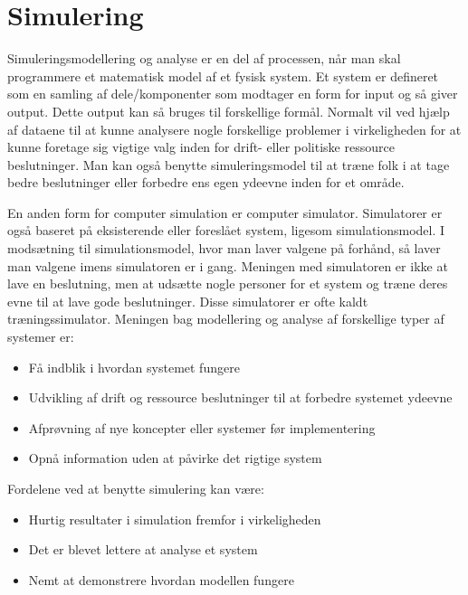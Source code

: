 \chapter{Simulering}\label{Simulering}

Simuleringsmodellering og analyse er en del af processen, når man skal programmere et matematisk model af et fysisk system. Et system er defineret som en samling af dele/komponenter som modtager en form for input og så giver output. Dette output kan så bruges til forskellige formål. Normalt vil ved hjælp af dataene til at kunne analysere nogle forskellige problemer i virkeligheden for at kunne foretage sig vigtige valg inden for drift- eller politiske ressource beslutninger. Man kan også benytte simuleringsmodel til at træne folk i at tage bedre beslutninger eller forbedre ens egen ydeevne inden for et område. \cite[s. 16-20]{SimulationHandbook}

\vspace{5mm}

En anden form for computer simulation er computer simulator. Simulatorer er også baseret på eksisterende eller foreslået system, ligesom simulationsmodel. I modsætning til simulationsmodel, hvor man laver valgene på forhånd, så laver man valgene imens simulatoren er i gang. Meningen med simulatoren er ikke at lave en beslutning, men at udsætte nogle personer for et system og træne deres evne til at lave gode beslutninger. Disse simulatorer er ofte kaldt træningssimulator. Meningen bag modellering og analyse af forskellige typer af systemer er:

\begin{itemize}
\item Få indblik i hvordan systemet fungere
\item Udvikling af drift og ressource beslutninger til at forbedre systemet ydeevne
\item Afprøvning af nye koncepter eller systemer før implementering
\item Opnå information uden at påvirke det rigtige system
\end{itemize}

\vspace{5mm}

Fordelene ved at benytte simulering kan være:
\begin{itemize}
\item Hurtig resultater i simulation fremfor i virkeligheden
\item Det er blevet lettere at analyse et system
\item Nemt at demonstrere hvordan modellen fungere
\end{itemize}

